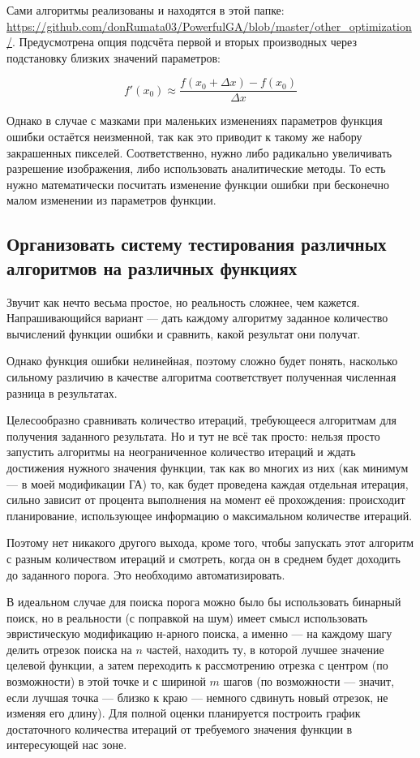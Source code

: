 Сами алгоритмы реализованы и находятся в этой папке: \url{https://github.com/donRumata03/PowerfulGA/blob/master/other_optimization/}.
Предусмотрена опция подсчёта первой и вторых производных через подстановку близких значений параметров:

\begin{equation}
    f'(x_0) \approx \frac{f(x_0 + \Delta x) - f(x_0)}{\Delta x}
\end{equation}

Однако в случае с мазками при маленьких изменениях параметров функция ошибки остаётся неизменной, так как это приводит к такому же набору закрашенных пикселей.
Соответственно, нужно либо радикально увеличивать разрешение изображения, либо использовать аналитические методы.
То есть нужно математически посчитать изменение функции ошибки при бесконечно малом изменении из параметров функции.

\subsection{Организовать систему тестирования различных алгоритмов на различных функциях}\label{itm:testing_system}
Звучит как нечто весьма простое, но реальность сложнее, чем кажется.
Напрашивающийся вариант — дать каждому алгоритму заданное количество вычислений функции ошибки и сравнить, какой результат они получат.

Однако функция ошибки нелинейная, поэтому сложно будет понять,
насколько сильному различию в качестве алгоритма соответствует полученная численная разница в результатах.

Целесообразно сравнивать количество итераций, требующееся алгоритмам для получения заданного результата.
Но и тут не всё так просто: нельзя просто запустить алгоритмы на неограниченное количество итераций
и ждать достижения нужного значения функции,
так как во многих из них (как минимум — в моей модификации ГА) то,
как будет проведена каждая отдельная итерация, сильно зависит от процента выполнения на момент её прохождения:
происходит планирование,  использующее информацию о максимальном количестве итераций.

Поэтому нет никакого другого выхода, кроме того, чтобы запускать этот алгоритм с разным количеством итераций и смотреть, когда он в среднем будет доходить до заданного порога.
Это необходимо автоматизировать.

В идеальном случае для поиска порога можно было бы использовать бинарный поиск, но в реальности (с поправкой на шум) имеет смысл использовать эвристическую модификацию н-арного поиска,
а именно — на каждому шагу делить отрезок поиска на $n$ частей, находить ту, в которой лучшее значение целевой функции, а затем переходить
к рассмотрению отрезка с центром (по возможности) в этой точке и с шириной $m$ шагов
(по возможности — значит, если лучшая точка — близко к краю — немного сдвинуть новый отрезок, не изменяя его длину).
Для полной оценки планируется построить график достаточного количества итераций от требуемого значения функции в интересующей нас зоне.

